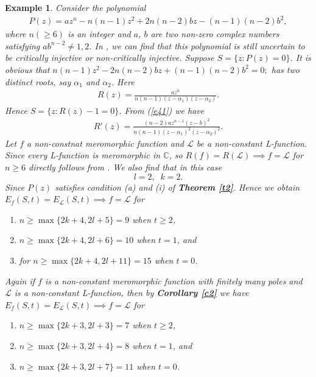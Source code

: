 \documentclass[a4paper,draft]{amsproc}
\theoremstyle{plain}
\newtheorem{exm}{Example}[section]
\theoremstyle{definition}
\theoremstyle{remark}
\newtheorem{rem}{Remark}[section]
\newcommand{\bea}{\begin{eqnarray}}
\newcommand{\eea}{\end{eqnarray}}
\numberwithin{equation}{section}
\begin{document}
\begin{exm}
Consider the polynomial 
\bea P(z)=az^n-n(n-1)z^2+2n(n-2)bz -(n-1)(n-2)b^2,\nonumber\eea
where $n(\geq6)$ is an integer and $a$, $b$ are two non-zero complex numbers satisfying
$ab^{n-2}\ne 1, 2$. In \cite[see section 5]{bl}, we can find that this polynomial is still uncertain to be critically injective or non-critically injective. Suppose $S=\{z:P(z)=0\}$.  It is obvious that $n(n-1)z^2-2n(n-2)bz +(n-1)(n-2)b^2=0;$ has two
distinct roots, say $\alpha_1$ and $\alpha_2$. 
Here  \bea\label{e41} R(z)=\frac{az^n}{n(n-1)(z-\alpha_1)(z-\alpha_2)}. \eea
Hence $S=\{z:R(z)-1=0\}$.
From (\ref{e41}) we have
\bea\nonumber R'(z)=\frac{(n-2)az^{n-1}(z-b)^2}{n(n-1)(z-\alpha_1)^2(z-\alpha_2)^2}.\eea
Let $f$  a non-constnat meromorphic function  and $\mathcal{L}$ be a non-constant L-function. Since every L-function is meromorphic in $\mathbb{C}$, so  $R(f)=R(\mathcal{L})\implies f=\mathcal{L}$ for $n\geq6$ directly follows from \cite[see page 67]{aljahari}.
We also find that in this case $$l=2,\;\;k=2. $$ Since $P(z)$ satisfies condition (a) and (i) of  {\em\bf Theorem \ref{t2}}. Hence we obtain $E_f(S, t)=E_\mathcal{L}(S,t)\implies f=\mathcal{L}$ for \begin{enumerate}
	\item $n\geq \max\{2k+4,2l+5\}=9$ when $t\geq2$,
	\item $n\geq \max\{2k+4,2l+6\}=10$ when $t=1$, and 
	\item for $n\geq \max\{2k+4,2l+11\}=15$ when $t=0$.
\end{enumerate}

Again if $f$ is a non-constant meromorphic function with finitely many poles and $\mathcal{L}$ is a non-constant L-function, then by {\em\bf Corollary \ref{c2}} we have $E_f(S, t)=E_\mathcal{L}(S,t)\implies f=\mathcal{L}$ for  
\begin{enumerate}
	\item $n \geq \max\{ 2k+3,2l+3\}=7$ when $t\geq 2 $,
	\item  $n \geq \max\{ 2k+3,2l+4\}=8$ when $t=1 $, and
	\item  $n \geq \max\{ 2k+3,2l+7\}=11$ when $t=0 $.
\end{enumerate} 
\end{exm}
\end{document}
